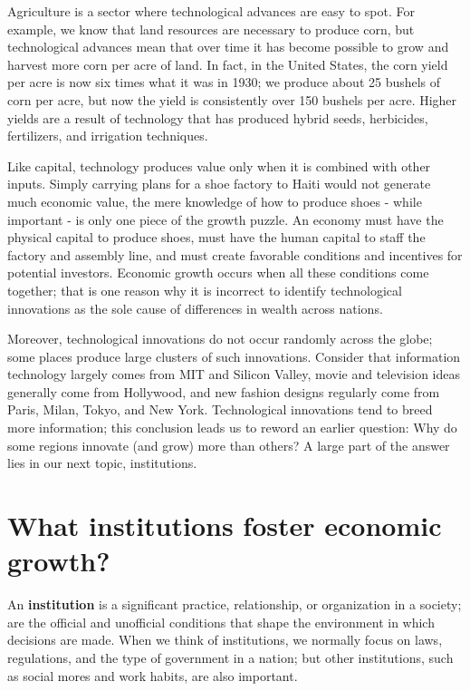 \documentclass[11pt]{article} %
\begin{document}
Agriculture is a sector where technological advances are easy to spot. For example, we know that land resources are necessary to produce corn, but technological advances mean that over time it has become possible to grow and harvest more corn per acre of land. In fact, in the United States, the corn yield per acre is now six times what it was in 1930; we produce about 25 bushels of corn per acre, but now the yield is consistently over 150 bushels per acre. Higher yields are a result of technology that has produced hybrid seeds, herbicides, fertilizers, and irrigation techniques.

Like capital, technology produces value only when it is combined with other inputs. Simply carrying plans for a shoe factory to Haiti would not generate much economic value, the mere knowledge of how to produce shoes - while important - is only one piece of the growth puzzle. An economy must have the physical capital to produce shoes, must have the human capital to staff the factory and assembly line, and must create favorable conditions and incentives for potential investors. Economic growth occurs when all these conditions come together; that is one reason why it is incorrect to identify technological innovations as the sole cause of differences in wealth across nations.

Moreover, technological innovations do not occur randomly across the globe; some places produce large clusters of such innovations. Consider that information technology largely comes from MIT and Silicon Valley, movie and television ideas generally come from Hollywood, and new fashion designs regularly come from Paris, Milan, Tokyo, and New York. Technological innovations tend to breed more information; this conclusion leads us to reword an earlier question: Why do some regions innovate (and grow) more than others? A large part of the answer lies in our next topic, institutions.

\section*{What institutions foster economic growth?}

An \textbf{institution} is a significant practice, relationship, or organization in a society; are the official and unofficial conditions that shape the environment in which decisions are made. When we think of institutions, we normally focus on laws, regulations, and the type of government in a nation; but other institutions, such as social mores and work habits, are also important.
\end{document}
